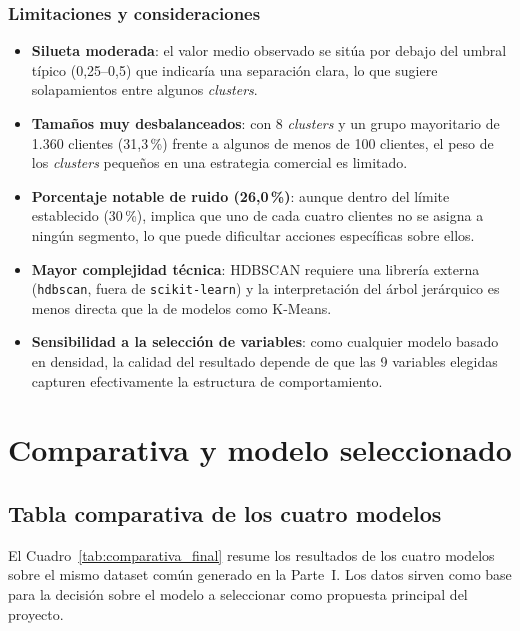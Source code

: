 \documentclass[11pt,a4paper]{article}
\begin{document}
\subsubsection{Limitaciones y consideraciones}

\begin{itemize}
    \item \textbf{Silueta moderada}: el valor medio observado se sitúa por debajo del umbral típico (0,25--0,5) que indicaría una separación clara, lo que sugiere solapamientos entre algunos \textit{clusters}.
    \item \textbf{Tamaños muy desbalanceados}: con 8 \textit{clusters} y un grupo mayoritario de 1.360 clientes (31,3\,\%) frente a algunos de menos de 100 clientes, el peso de los \textit{clusters} pequeños en una estrategia comercial es limitado.
    \item \textbf{Porcentaje notable de ruido (26,0\,\%)}: aunque dentro del límite establecido (30\,\%), implica que uno de cada cuatro clientes no se asigna a ningún segmento, lo que puede dificultar acciones específicas sobre ellos.
    \item \textbf{Mayor complejidad técnica}: HDBSCAN requiere una librería externa (\texttt{hdbscan}, fuera de \texttt{scikit-learn}) y la interpretación del árbol jerárquico es menos directa que la de modelos como K-Means.
    \item \textbf{Sensibilidad a la selección de variables}: como cualquier modelo basado en densidad, la calidad del resultado depende de que las 9 variables elegidas capturen efectivamente la estructura de comportamiento.
\end{itemize}

\section{Comparativa y modelo seleccionado}

\subsection{Tabla comparativa de los cuatro modelos}

El Cuadro~\ref{tab:comparativa_final} resume los resultados de los cuatro modelos sobre el mismo dataset común generado en la Parte~I. Los datos sirven como base para la decisión sobre el modelo a seleccionar como propuesta principal del proyecto.
\end{document}
